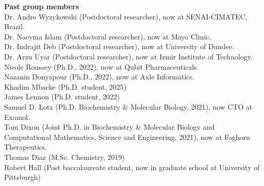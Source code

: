 \documentclass[margin,line]{res}
\begin{document}
\begin{resume}
{\bf Past group members}\\
Dr. Andre Wyzykowski (Postdoctoral researcher), now at SENAI-CIMATEC, Brazil. \\
Dr. Naeyma Islam (Postdoctoral researcher), now at Mayo Clinic. \\
Dr. Indrajit Deb (Postdoctoral researcher), now at University of Dundee. \\
Dr. Arzu Uyar (Postdoctoral researcher), now at Izmir Institute of Technology.\\
Nicole Roussey (Ph.D., 2022), now at Qubit Pharmaceuticals. \\
Nazanin Donyapour (Ph.D., 2022), now at Axle Informatics. \\
Khadim Mbacke (Ph.D. student, 2025) \\
James Lennon (Ph.D. student, 2022) \\
Samuel D. Lotz (Ph.D. Biochemistry \& Molecular Biology, 2021), now CTO at Examol.\\
Tom Dixon (Joint Ph.D. in Biochemistry \& Molecular Biology and Computational Mathematics, Science and Engineering, 2021), now at Foghorn Therapeutics. \\
Thomas Diaz (M.Sc. Chemistry, 2019)\\
Robert Hall (Post baccalaureate student, now in graduate school at University of Pittsburgh)\\


\end{resume}
\end{document}
